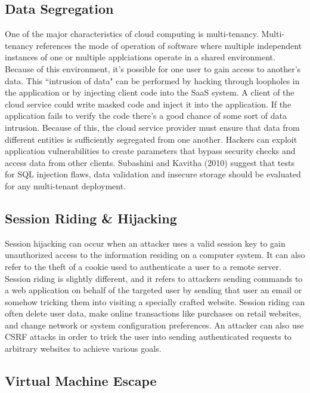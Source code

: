 \documentclass[a4paper, 8pt]{article} %
\begin{document}
\begin{doublespacing}
\iffalse %

\subsection*{Data Segregation}

One of the major characteristics of cloud computing is multi-tenancy.  Multi-tenancy references the mode of operation of software where multiple independent instances of one or multiple applciations operate in a shared environment.  Because of this environment, it's possible for one user to gain access to another's data.  This ``intrusion of data" can be performed by hacking through loopholes in the application or by injecting client code into the SaaS system.  A client of the cloud service could write masked code and inject it into the application.  If the application fails to verify the code there's a good chance of some sort of data intrusion.  Because of this, the cloud service provider must ensure that data from different entities is sufficiently segregated from one another.  Hackers can exploit application vulnerabilities to create parameters that bypass security checks and access data from other clients.  Subashini and Kavitha (2010) suggest that tests for SQL injection flaws, data validation and insecure storage should be evaluated for any multi-tenant deployment.  

\subsection*{Session Riding \& Hijacking}

Session hijacking can occur when an attacker uses a valid session key to gain unauthorized access to the information residing on a computer system.  It can also refer to the theft of a cookie used to authenticate a user to a remote server.  Session riding is slightly different, and it refers to attackers sending commands to a web application on behalf of the targeted user by sending that user an email or somehow tricking them into visiting a specially crafted website.  Session riding can often delete user data, make online transactions like purchases on retail websites, and change network or system configuration preferences.  An attacker can also use CSRF attacks in order to trick the user into sending authenticated requests to arbitrary websites to achieve various goals.  

\subsection*{Virtual Machine Escape}


\end{doublespacing}
\end{document}
